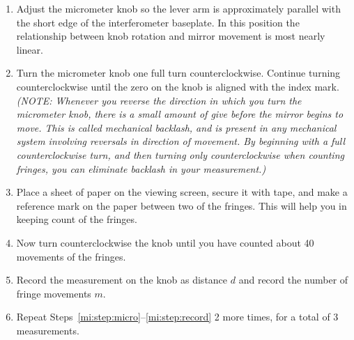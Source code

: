 \begin{enumerate}
	\item\label{mi:step:micro} Adjust the micrometer knob so the lever arm is approximately parallel with the short edge of the interferometer
	baseplate. In this position the relationship between knob rotation and mirror movement is most nearly linear.
	
	\item Turn the micrometer knob one full turn counterclockwise. Continue turning counterclockwise until the zero on the
	knob is aligned with the index mark. \textit{(NOTE: Whenever you reverse the direction in which you turn the micrometer
	knob, there is a small amount of give before the mirror begins to move. This is called mechanical backlash, and is
	present in any mechanical system involving reversals in direction of movement. By beginning with a full
	counterclockwise turn, and then turning only counterclockwise when counting fringes, you can eliminate backlash
	in your measurement.)}

	\item Place a sheet of paper on the viewing screen, secure it with tape, and make a reference mark on the paper between
	two of the fringes. This will help you in keeping count of the fringes.
	
	\item Now turn counterclockwise the knob until you have counted about 40 movements of the fringes.
	
	\item\label{mi:step:record} Record the measurement on the knob as distance $d$ and record the number of fringe movements $m$.
	
	\item Repeat Steps~\ref{mi:step:micro}--\ref{mi:step:record} 2 more times, for a total of 3 measurements.
\end{enumerate}

